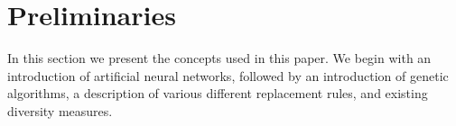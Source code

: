 \section{Preliminaries}
\label{sec:preliminaries}
In this section we present the concepts used in this paper.
We begin with an introduction of artificial neural networks, followed by an introduction of genetic algorithms, a description of various different replacement rules, and existing diversity measures.








